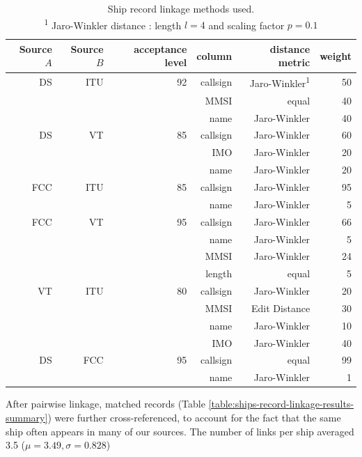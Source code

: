 \begin{table}[htbp]
  \begin{tabular}{rrrrrr} %
    \hline
    Source $A$ & Source $B$ & acceptance level & column & distance metric & weight \\
    \hline
     DS & ITU & 92 & callsign & Jaro-Winkler\textsuperscript{1} & 50 \\
        &     &    & MMSI & equal & 40 \\
        &     &    & name & Jaro-Winkler & 40 \\
     DS &  VT & 85 & callsign & Jaro-Winkler & 60 \\
        &     &    & IMO & Jaro-Winkler & 20 \\
        &     &    & name & Jaro-Winkler & 20 \\
    FCC & ITU & 85 & callsign & Jaro-Winkler & 95 \\
        &     &    & name & Jaro-Winkler & 5 \\
    FCC &  VT & 95 & callsign & Jaro-Winkler & 66 \\
        &     &    & name & Jaro-Winkler & 5 \\
        &     &    & MMSI & Jaro-Winkler & 24 \\
        &     &    & length & equal & 5 \\
     VT & ITU & 80 & callsign & Jaro-Winkler & 20 \\
        &     &    & MMSI & Edit Distance & 30 \\
        &     &    & name & Jaro-Winkler & 10 \\
        &     &    & IMO & Jaro-Winkler & 40 \\
     DS & FCC & 95 & callsign & equal & 99 \\
        &     &    & name & Jaro-Winkler& 1 \\
  \end{tabular}
  \caption{Ship record linkage methods used. \\
    \textsuperscript{1} Jaro-Winkler distance \cite{winkler1990string}: length $l = 4$ and scaling factor $p = 0.1$}
  \label{table:ships-record-linkage-methods}
\end{table}

After pairwise linkage, matched records (Table \ref{table:ships-record-linkage-results-summary}) were further cross-referenced, %
 to account for the fact that the same ship often appears in many of our sources. The number of links per ship averaged 3.5 ($\mu = 3.49, \sigma = 0.828$) %

